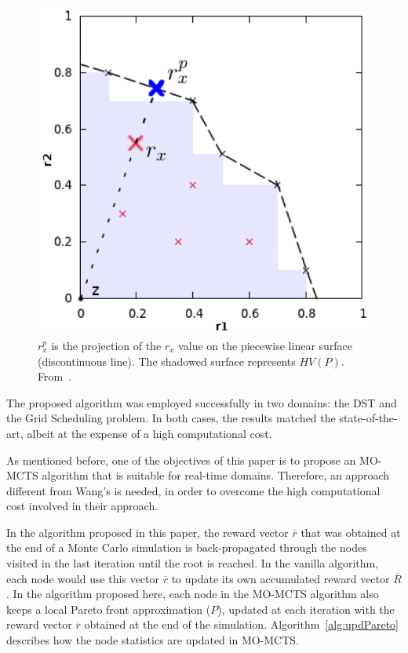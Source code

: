 \documentclass[journal]{IEEEtran}
\begin{document}
\begin{figure}[!t]
\begin{center}
\includegraphics[width=0.65\columnwidth]{figures/perez4}
\end{center}
\caption{$r^p_x$ is the projection of the $r_x$ value on the piecewise linear surface (discontinuous line). The shadowed surface represents $HV(P)$. From~\cite{Weijia2012}.}
\label{fig:wangHV}
\end{figure}
 
The proposed algorithm was employed successfully in two domains: the DST and the Grid Scheduling problem. In both cases, the results matched the state-of-the-art, albeit at the expense of a high computational cost.

As mentioned before, one of the objectives of this paper is to propose an MO-MCTS algorithm that is suitable for real-time domains. Therefore, an approach different from Wang's is needed, in order to overcome the high computational cost involved in their approach.

In the algorithm proposed in this paper, the reward vector $\overline{r}$ that was obtained at the end of a Monte Carlo simulation is back-propagated through the nodes visited in the last iteration until the root is reached. In the vanilla algorithm, each node would use this vector $\overline{r}$ to update its own accumulated reward vector $\overline{R}$. In the algorithm proposed here, each node in the MO-MCTS algorithm also keeps a local Pareto front approximation ($P$), updated at each iteration with the reward vector $\overline{r}$ obtained at the end of the simulation. Algorithm~\ref{alg:updPareto} describes how the node statistics are updated in MO-MCTS.
\end{document}
